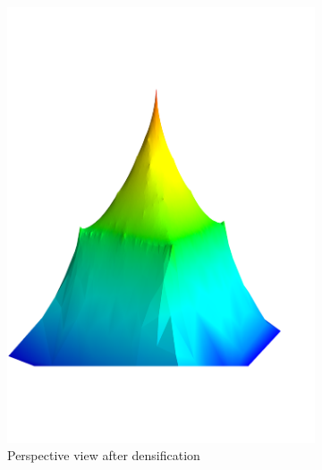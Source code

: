 \begin{figure}
\begin{subfigure}[b]{0.3\linewidth}
    \includegraphics[width=\textwidth]{figs/pyramid_v_pers}
    \caption{Perspective view after densification}
  \end{subfigure}  
  \quad
  \begin{subfigure}[b]{0.3\linewidth}
    \centering

\end{subfigure}
\end{figure}
